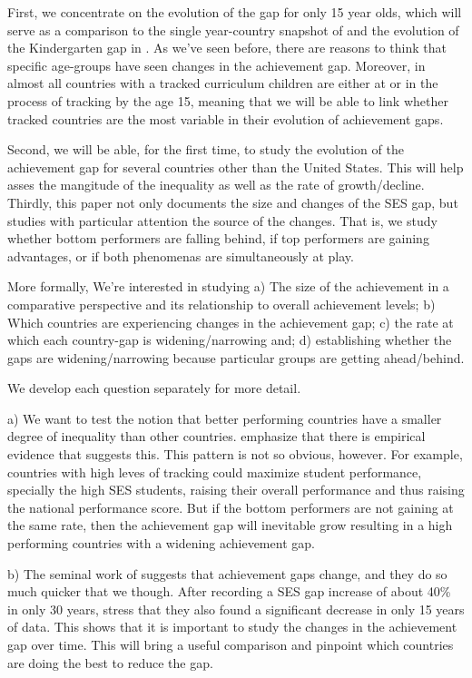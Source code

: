 \documentclass[11pt, a4paper]{article}\usepackage[]{graphicx}\usepackage[]{color}
\begin{document}
First, we concentrate on the evolution of the gap for only 15 year olds, which will serve as a comparison to the single year-country snapshot of \citet{anna2016} and the evolution of the Kindergarten gap in \citet{reardon_portilla}. As we've seen before, there are reasons to think that specific age-groups have seen changes in the achievement gap. Moreover, in almost all countries with a tracked curriculum children are either at or in the process of tracking by the age 15, meaning that we will be able to link whether tracked countries are the most variable in their evolution of achievement gaps.

Second, we will be able, for the first time, to study the evolution of the achievement gap for several countries other than the United States. This will help asses the mangitude of the inequality as well as the rate of growth/decline. Thirdly, this paper not only documents the size and changes of the SES gap, but studies with particular attention the source of the changes. That is, we study whether bottom performers are falling behind, if top performers are gaining advantages, or if both phenomenas are simultaneously at play.

More formally, We're interested in studying
a) The size of the achievement in a comparative perspective and its relationship to overall achievement levels;
b) Which countries are experiencing changes in the achievement gap;
c) the rate at which each country-gap is widening/narrowing and;
d) establishing whether the gaps are widening/narrowing because particular groups are getting ahead/behind.

We develop each question separately for more detail.

a) We want to test the notion that better performing countries have a smaller degree of inequality than other countries. \citep{werfhorst_mijs} emphasize that there is empirical evidence that suggests this. This pattern is not so obvious, however. For example, countries with high leves of tracking could maximize student performance, specially the high SES students, raising their overall performance and thus raising the national performance score. But if the bottom performers are not gaining at the same rate, then the achievement gap will inevitable grow resulting in a high performing countries with a widening achievement gap.

b) The seminal work of \citet{reardon2011} suggests that achievement gaps change, and they do so much quicker that we though. After recording a SES gap increase of about 40\% in only 30 years, \citep{reardon_portilla} stress that they also found a significant decrease in only 15 years of data. This shows that it is important to study the changes in the achievement gap over time. This will bring a useful comparison and pinpoint which countries are doing the best to reduce the gap.
\end{document}
